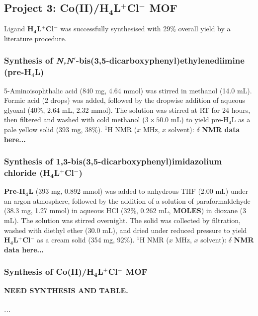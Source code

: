 \documentclass[12pt,a4paper]{article}
\begin{document}
\subsection{Project 3: Co(II)/\textbf{H$\bm{_4}$L$\bm{^+}$Cl$\bm{^-}$} MOF}\label{synth:p3}
Ligand \textbf{H$\bm{_4}$L$\bm{^+}$Cl$\bm{^-}$} was successfully synthesised with 29\% overall yield by a literature procedure\cite{sen2014construction}.

\subsubsection{Synthesis of \emph{N,N}$'$-bis(3,5-dicarboxyphenyl)ethylenediimine (pre-H$_4$L)}\label{synth:H4L-1}
5-Aminoisophthalic acid (840 mg, 4.64 mmol) was stirred in methanol (14.0 mL). Formic acid (2 drops) was added, followed by the dropwise addition of aqueous glyoxal (40\%, 2.64 mL, 2.32 mmol). The solution was stirred at RT for 24 hours, then filtered and washed with cold methanol ($3\times 50.0$ mL) to yield pre-H$_4$L as a pale yellow solid (393 mg, 38\%). $^1$H NMR ($x$ MHz, $x$ solvent): $\delta$ \textbf{NMR data here...}

\subsubsection{Synthesis of 1,3-bis(3,5-dicarboxyphenyl)imidazolium chloride (\textbf{H$\bm{_4}$L$\bm{^+}$Cl$\bm{^-}$})}\label{synth:H4L-2}
\textbf{Pre-H$\bm{_4}$L} (393 mg, 0.892 mmol) was added to anhydrous THF (2.00 mL) under an argon atmosphere, followed by the addition of a solution of paraformaldehyde (38.3 mg, 1.27 mmol) in aqueous HCl (32\%, 0.262 mL, \textbf{MOLES}) in dioxane (3 mL). The solution was stirred overnight. The solid was collected by filtration, washed with diethyl ether (30.0 mL), and dried under reduced pressure to yield \textbf{H$\bm{_4}$L$\bm{^+}$Cl$\bm{^-}$} as a cream solid (354 mg, 92\%). $^1$H NMR ($x$ MHz, $x$ solvent): $\delta$ \textbf{NMR data here...}

\subsubsection{Synthesis of Co(II)/\textbf{H$\bm{_4}$L$\bm{^+}$Cl$\bm{^-}$} MOF}\label{synth:Co-MOF}
\textbf{NEED SYNTHESIS AND TABLE.}
\begin{table}[h]
	\footnotesize
	\caption{...}\label{tab:Co1}
	\begin{center}
		\begin{tabular}{cccccccccc}
\hline
		\end{tabular}
	\end{center}
\end{table}
\end{document}
